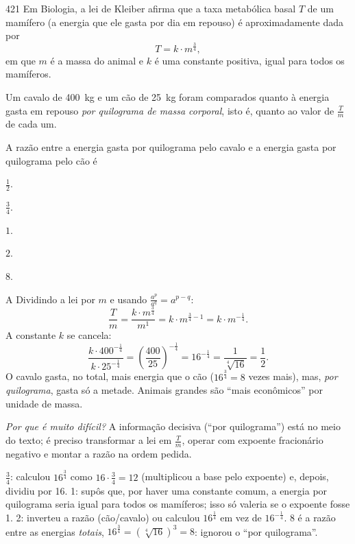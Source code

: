 \begin{questaoinedita}{4}{21}
Em Biologia, a lei de Kleiber afirma que a taxa metabólica basal $T$ de um mamífero (a energia que
ele gasta por dia em repouso) é aproximadamente dada por
\[T=k\cdot m^{\frac{3}{4}},\]
em que $m$ é a massa do animal e $k$ é uma constante positiva, igual para todos os mamíferos.

Um cavalo de 400~kg e um cão de 25~kg foram comparados quanto à energia gasta em repouso
\emph{por quilograma de massa corporal}, isto é, quanto ao valor de $\frac{T}{m}$ de cada um.

A razão entre a energia gasta por quilograma pelo cavalo e a energia gasta por quilograma pelo
cão é
\begin{alternativas*}[5]
\item $\frac{1}{2}$.
\item $\frac{3}{4}$.
\item $1$.
\item $2$.
\item $8$.
\end{alternativas*}
\end{questaoinedita}
\begin{resolucao}{A}
 Dividindo a lei por $m$ e usando $\frac{a^p}{a^q}=a^{p-q}$:
\[\frac{T}{m}=\frac{k\cdot m^{\frac{3}{4}}}{m^{1}}=k\cdot m^{\frac{3}{4}-1}=k\cdot m^{-\frac{1}{4}}.\]
 A constante $k$ se cancela:
\[\frac{k\cdot 400^{-\frac{1}{4}}}{k\cdot 25^{-\frac{1}{4}}}=\left(\frac{400}{25}\right)^{-\frac{1}{4}}
=16^{-\frac{1}{4}}=\frac{1}{\sqrt[4]{16}}=\frac{1}{2}.\]
 O cavalo gasta, no total, mais energia que o cão ($16^{\frac{3}{4}}=8$ vezes
mais), mas, \emph{por quilograma}, gasta só a metade. Animais grandes são ``mais econômicos'' por
unidade de massa.

\textit{Por que é muito difícil?} A informação decisiva (``por quilograma'') está no meio do texto;
é preciso transformar a lei em $\frac{T}{m}$, operar com expoente fracionário negativo e montar a
razão na ordem pedida.
\begin{distratores}
 $\frac{3}{4}$: calculou $16^{\frac{3}{4}}$ como $16\cdot\frac{3}{4}=12$ (multiplicou a base
pelo expoente) e, depois, dividiu por 16.
 1: supôs que, por haver uma constante comum, a energia por quilograma seria igual para
todos os mamíferos; isso só valeria se o expoente fosse 1.
 2: inverteu a razão (cão/cavalo) ou calculou $16^{\frac{1}{4}}$ em vez de $16^{-\frac{1}{4}}$.
 8 é a razão entre as energias \emph{totais}, $16^{\frac{3}{4}}=(\sqrt[4]{16})^3=8$: ignorou
o ``por quilograma''.
\end{distratores}
\end{resolucao}
